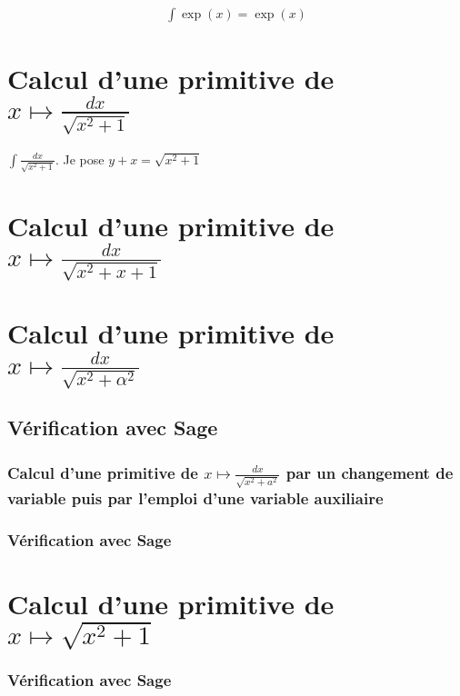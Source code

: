 \documentclass[a4paper,14pt]{extreport} %
\begin{document}
\begin{align*}
\int \exp(x) = \exp(x)
\end{align*}






\section{Calcul d'une primitive de $ x \longmapsto  \frac{dx}{\sqrt{x^2 + 1} } $ }


$\int \frac{dx}{\sqrt{x^2 + 1}}$. Je pose $y+x = \sqrt{x^2+1} $


\section{Calcul d'une primitive de $  x \longmapsto  \frac{dx}{\sqrt{x^2+ x + 1} } $ }




\section{Calcul d'une primitive de $  x \longmapsto  \frac{dx}{\sqrt{x^2+ \alpha^2} } $ }

\subsection{Vérification avec Sage}



\subsubsection{Calcul d'une primitive de $  x \longmapsto  \frac{dx}{\sqrt{x^2+ a^2} } $ par un changement de variable puis par l'emploi d'une variable auxiliaire} 

\subsubsection{Vérification avec Sage}

\section{Calcul d'une primitive de $  x \longmapsto  \sqrt{x^2 + 1}  $ \label{sqrt-001} }

\subsubsection{Vérification avec Sage}
\end{document}
